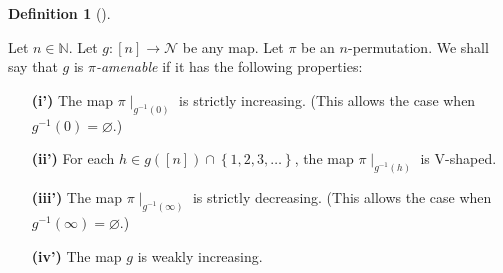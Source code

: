 \documentclass[numbers=enddot,12pt,final,onecolumn,notitlepage]{scrartcl}%
\theoremstyle{definition}
\newtheorem{defi}[theo]{Definition}
\newenvironment{definition}[1][]
{\begin{defi}[#1]\begin{leftbar}}
{\end{leftbar}\end{defi}}
\begin{document}
\begin{definition}
\label{def.amen}
Let $n\in\mathbb{N}$. Let $g:\left[  n\right]  \rightarrow\mathcal{N}$ be any
map. Let $\pi$ be an $n$-permutation. We shall say that $g$ is $\pi
$\textit{-amenable} if it has the following properties:

\begin{enumerate}
\item[\textbf{(i')}] The map $\pi\mid_{g^{-1}\left(  0\right)  }$ is strictly
increasing. (This allows the case when $g^{-1}\left(  0\right)  =\varnothing$.)

\item[\textbf{(ii')}] For each $h\in g\left(  \left[  n\right]  \right)
\cap\left\{  1,2,3,\ldots\right\}  $, the map $\pi\mid_{g^{-1}\left(
h\right)  }$ is V-shaped.

\item[\textbf{(iii')}] The map $\pi\mid_{g^{-1}\left(  \infty\right)  }$ is
strictly decreasing. (This allows the case when $g^{-1}\left(  \infty\right)
=\varnothing$.)

\item[\textbf{(iv')}] The map $g$ is weakly increasing.
\end{enumerate}
\end{definition}
\end{document}
